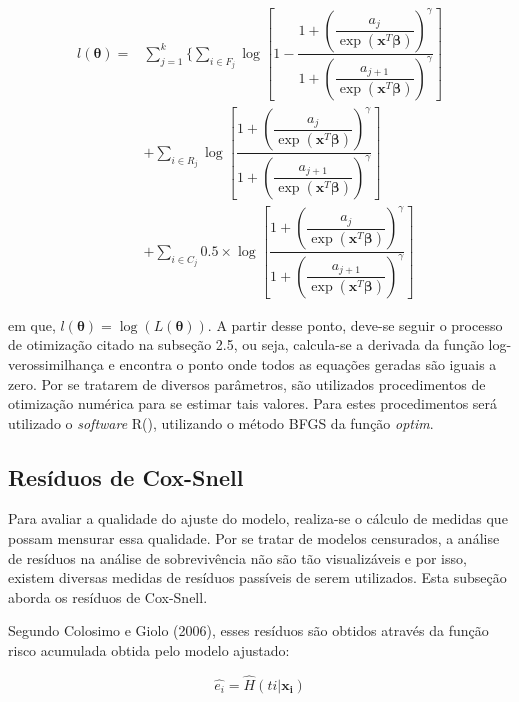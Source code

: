 \documentclass[a4paper,12pt]{article}
\begin{document}
\begin{equation} \label{eq:llike_groupMod}
  \begin{split}
    l(\boldsymbol{\theta}) = & \sum\limits_{j=1}^k\Bigg\{ \sum\limits_{i\in F_j} \log\left[1 - \dfrac{1 + \left(\dfrac{a_j}{\exp(\boldsymbol{x}^T\boldsymbol{\beta})}\right)^{\gamma}}{1 + \left(\dfrac{a_{j+1}}{\exp(\boldsymbol{x}^T\boldsymbol{\beta})}\right)^{\gamma}}\right] \\
    & +\sum\limits_{i\in R_j} \log\left[\dfrac{1 + \left(\dfrac{a_j}{\exp(\boldsymbol{x}^T\boldsymbol{\beta})}\right)^{\gamma}}{1 + \left(\dfrac{a_{j+1}}{\exp(\boldsymbol{x}^T\boldsymbol{\beta})}\right)^{\gamma}}\right] \\
    & + \sum\limits_{i\in C_j} 0.5\times \log\left[\dfrac{1 + \left(\dfrac{a_j}{\exp(\boldsymbol{x}^T\boldsymbol{\beta})}\right)^{\gamma}}{1 + \left(\dfrac{a_{j+1}}{\exp(\boldsymbol{x}^T\boldsymbol{\beta})}\right)^{\gamma}}\right]
  \end{split}
\end{equation}

\noindent em que, $l(\boldsymbol{\theta}) = \log(L(\boldsymbol{\theta}))$. A partir desse ponto, deve-se seguir o processo de otimização citado na subseção 2.5, ou seja, calcula-se a derivada da função log-verossimilhança e encontra o ponto onde todos as equações geradas são iguais a zero. Por se tratarem de diversos parâmetros, são utilizados procedimentos de otimização numérica para se estimar tais valores. Para estes procedimentos será utilizado o \textit{software} R(\cite{R}), utilizando o método BFGS da função \textit{optim}.

\subsection{Resíduos de Cox-Snell}

Para avaliar a qualidade do ajuste do modelo, realiza-se o cálculo de medidas que possam mensurar essa qualidade. Por se tratar de modelos censurados, a análise de resíduos na análise de sobrevivência não são tão visualizáveis e por isso, existem diversas medidas de resíduos passíveis de serem utilizados. Esta subseção aborda os resíduos de Cox-Snell.

Segundo Colosimo e Giolo (2006), esses resíduos são obtidos através da função risco acumulada obtida pelo modelo ajustado:

\begin{equation} \label{eq:cox}
  \hat{e_i} = \hat{H}(ti|\boldsymbol{x_i})
\end{equation}
\end{document}
